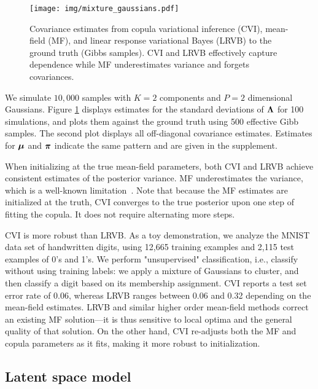 \begin{figure}[t]
  \centering
  \texttt{[image: img/mixture\_gaussians.pdf]}
  \caption{\label{fig:lrvb}Covariance estimates from
  copula variational inference (\gls{CVI}), mean-field (\gls{MF}), and
  linear response variational Bayes (\gls{LRVB}) to the ground truth
  (Gibbs samples). \gls{CVI} and \gls{LRVB} effectively capture dependence
  while \gls{MF} underestimates variance and forgets covariances.}
\end{figure}

We simulate $10,000$ samples with $K=2$ components and $P=2$
dimensional Gaussians. Figure \ref{fig:lrvb} displays estimates for
the standard deviations of $\boldsymbol{\mathbf{\Lambda}}$ for 100 simulations, and plots
them against the ground truth using 500 effective Gibb samples. The
second plot displays all off-diagonal covariance estimates. Estimates
for $\boldsymbol{\mathbf{\mu}}$ and $\boldsymbol{\mathbf{\pi}}$ indicate the same pattern and are given in the
supplement.

When initializing at the true mean-field parameters, both \gls{CVI}
and \gls{LRVB} achieve consistent estimates of the posterior variance. \gls{MF} underestimates the variance, which is a well-known
limitation~\citep{wainwright2008graphical}. Note that
because the \gls{MF} estimates are initialized at the truth, \gls{CVI}
converges to the true posterior upon one step of fitting the copula. It does not require alternating more steps.

\Gls{CVI} is more robust than \gls{LRVB}. As a toy demonstration, we
analyze the MNIST data set of handwritten digits, using 12,665
training examples and 2,115 test examples of 0's and 1's. We perform
"unsupervised" classification, i.e., classify without using training
labels: we apply a mixture of Gaussians to cluster, and then classify
a digit based on its membership assignment. \gls{CVI} reports a test
set error rate of 0.06, whereas \gls{LRVB} ranges between 0.06 and
0.32 depending on the mean-field estimates. \gls{LRVB} and similar
higher order mean-field methods correct an existing \gls{MF}
solution---it is thus sensitive to local optima and the general
quality of that solution. On the other hand, \gls{CVI} re-adjusts both
the \gls{MF} and copula parameters as it fits, making it more robust
to initialization.

\subsection{Latent space model}
\label{subsec:latent}

